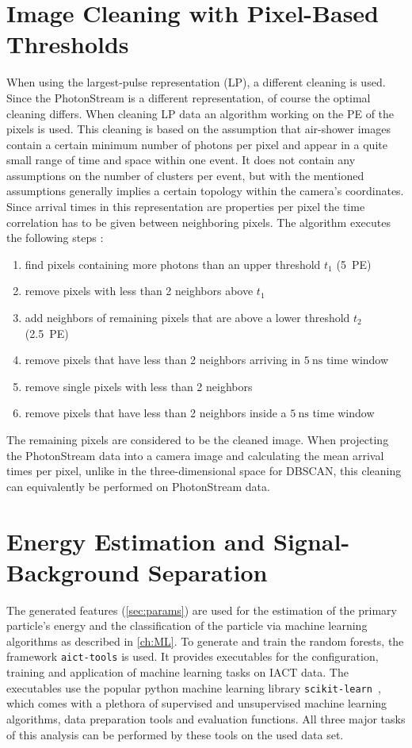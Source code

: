 \section{Image Cleaning with Pixel-Based Thresholds}
\label{sec:thresh}
%
When using the largest-pulse representation (LP), a different cleaning is
used. Since the PhotonStream is a different representation, of course the
optimal cleaning differs. When cleaning LP data an algorithm working on the PE
of the pixels is used. This cleaning is based on the assumption that air-shower
images contain a certain minimum number of photons per pixel and appear in a
quite small range of time and space within one event. It does not contain any
assumptions on the number of clusters per event, but with the mentioned
assumptions generally implies a certain topology within the camera's
coordinates. Since arrival times in this representation are properties per
pixel the time correlation has to be given between neighboring pixels. The
algorithm executes the following steps \cite{facttools}:
%
\begin{enumerate}
  \item find pixels containing more photons than an upper threshold $t_1$ (5~PE)
  \item remove pixels with less than 2 neighbors above $t_1$
  \item add neighbors of remaining pixels that are above a lower threshold $t_2$ (2.5~PE)
  \item remove pixels that have less than 2 neighbors arriving in $\SI{5}{\nano\second}$ time window
  \item remove single pixels with less than 2 neighbors
  \item remove pixels that have less than 2 neighbors inside a $\SI{5}{\nano\second}$ time window
\end{enumerate}
%
The remaining pixels are considered to be the cleaned image. When projecting
the PhotonStream data into a camera image and calculating the mean arrival
times per pixel, unlike in the three-dimensional space for DBSCAN, this
cleaning can equivalently be performed on PhotonStream data.


\section{Energy Estimation and Signal-Background Separation}
%
The generated features (\autoref{sec:params}) are used for the estimation of
the primary particle's energy and the classification of the particle via
machine learning algorithms as described in \autoref{ch:ML}. To generate and
train the random forests, the framework \texttt{aict-tools} \cite{aicttools} is
used. It provides executables for the configuration, training and application
of machine learning tasks on IACT data. The executables use the popular python
machine learning library \texttt{scikit-learn}~\cite{scikit-learn}, which comes
with a plethora of supervised and unsupervised machine learning algorithms,
data preparation tools and evaluation functions. All three major tasks of this
analysis can be performed by these tools on the used data set.
